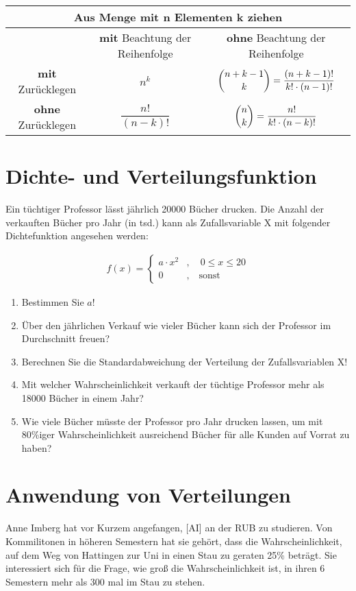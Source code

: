 \documentclass[11pt, a4paper]{article}
\begin{document}
\vspace{\baselineskip}
\begin{tabular}{|c||c|c|}
	\hline
	\multicolumn{3}{|c|}{Aus Menge mit \textbf{n} Elementen \textbf{k} ziehen} \\
	\hline
	 & \textbf{mit} Beachtung der Reihenfolge & \textbf{ohne} Beachtung der Reihenfolge \\
	\hline \hline
	\textbf{mit} Zurücklegen & $n^k$ & $\dbinom{n+k-1}{k} = \dfrac{(n+k-1)!}{k!\cdot (n-1)!}$ \\
	\hline
	\textbf{ohne} Zurücklegen & $\dfrac{n!}{(n-k)!}$ & $\dbinom{n}{k} = \dfrac{n!}{k!\cdot (n-k)!}$ \\
\hline
\end{tabular}

\newpage
\section{Dichte- und Verteilungsfunktion}

Ein tüchtiger Professor lässt jährlich 20000 Bücher drucken. Die Anzahl der verkauften Bücher pro Jahr (in tsd.) kann als Zufallsvariable X mit folgender Dichtefunktion angesehen werden:

\begin{align*}
f(x) = \begin{cases}a \cdot x^2 & , \quad 0 \leq x \leq 20\\ 0 & , \quad \text{sonst}\end{cases}
\end{align*}

\begin{enumerate}[label=\alph*)]
\item 	Bestimmen Sie $a$!
\item   Über den jährlichen Verkauf wie vieler Bücher kann sich der Professor im Durchschnitt freuen?
\item   Berechnen Sie die Standardabweichung der Verteilung der Zufallsvariablen X!
\item   Mit welcher Wahrscheinlichkeit verkauft der tüchtige Professor mehr als 18000 Bücher in einem Jahr?
\item   Wie viele Bücher müsste der Professor pro Jahr drucken lassen, um mit 80\%iger Wahrscheinlichkeit ausreichend Bücher für alle Kunden auf Vorrat zu haben?
\end{enumerate}

\newpage
\section{Anwendung von Verteilungen}
Anne Imberg hat vor Kurzem angefangen, \textcolor{AI-BLUE}{[AI]} an der RUB zu studieren. Von Kommilitonen in höheren Semestern hat sie gehört, dass die Wahrscheinlichkeit, auf dem Weg von Hattingen zur Uni in einen Stau zu geraten 25\% beträgt. Sie interessiert sich für die Frage, wie groß die Wahrscheinlichkeit ist, in ihren 6 Semestern mehr als 300 mal im Stau zu stehen.
\end{document}
